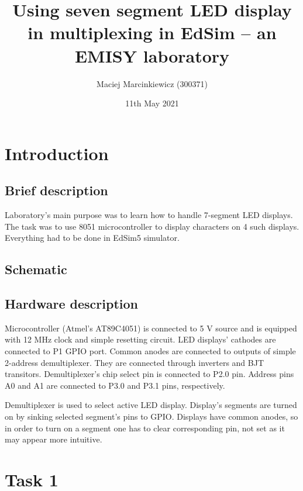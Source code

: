 \documentclass{article}
\title{Using seven segment LED display in multiplexing in EdSim -- an EMISY laboratory}
\author{Maciej Marcinkiewicz (300371)}
\date{11th May 2021}
\begin{document}
\maketitle

\section{Introduction}
\subsection{Brief description}
Laboratory's main purpose was to learn how to handle 7-segment LED displays. The task
was to use 8051 microcontroller to display characters on 4 such displays. Everything
had to be done in EdSim5 simulator.

\subsection{Schematic}

\subsection{Hardware description}
Microcontroller (Atmel's AT89C4051) is connected to 5 V source and is equipped with 12 MHz clock and 
simple resetting circuit. LED displays' cathodes are connected to P1 GPIO port. Common anodes
are connected to outputs of simple 2-address demultiplexer. They are connected through inverters
and BJT transitors. Demultiplexer's chip select pin is connected to P2.0 pin. Address pins
A0 and A1 are connected to P3.0 and P3.1 pins, respectively.

Demultiplexer is used to select active LED display. Display's segments are turned on by
sinking selected segment's pins to GPIO. Displays have common anodes, so in order to
turn on a segment one has to clear corresponding pin, not set as it may appear more intuitive.

\section{Task 1}
\end{document}
